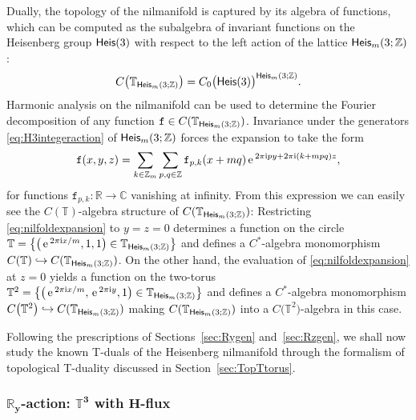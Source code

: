 \documentclass[10pt,a4paper]{amsart}
\numberwithin{equation}{section}
\newcommand{\Z}{\zed}
\def\ii{{{\rm i}}}
\newcommand{\Heis}{{\sf Heis}}
\newcommand{\complex}{{\mathbb C}} %
\newcommand{\zed}{{\mathbb Z}} %
\newcommand{\real}{{\mathbb R}} %
\newcommand{\torus}{{\mathbb T}} %
\def\e{{\,\rm e}\,}
\begin{document}
Dually, the topology of the nilmanifold is captured by its algebra of
functions, which can be computed as the subalgebra of invariant
functions on the
Heisenberg group $\Heis(3)$ with respect to the left action of the
lattice $\Heis_m(3;\Z)$:
\[
C\big(\torus_{\Heis_m(3;\Z)}\big) =
C_0\big(\Heis(3)\big)^{\Heis_m(3;\Z)} .
\]
Harmonic analysis on the nilmanifold can be used to determine the
Fourier decomposition of any function $\mathtt{f}\in
C(\torus_{\Heis_m(3;\Z)})$. Invariance under the generators
\eqref{eq:H3integeraction} of $\Heis_m(3;\Z)$ forces the expansion to take the form
\begin{gather}\label{eq:nilfoldexpansion}
\mathtt{f}(x,y,z) = \sum_{k\in\Z_m} \sum_{p,q\in\Z} \mathtt{f}_{p,k}(x+m q)
\e^{2\pi\ii p y +2\pi\ii (k+m p q) z} ,
\end{gather}
for functions $\mathtt{f}_{p,k}\colon \real\to\complex$ vanishing at
infinity. From this expression we can easily see the
$C(\torus)$-algebra structure of $C(\torus_{\Heis_m(3;\Z)})$: Restricting \eqref{eq:nilfoldexpansion} to $y=z=0$
determines a function on the circle $\torus=\big\{\big(\e^{2\pi\ii x/m},1,1\big)\in\torus_{\Heis_m(3;\Z)}\big\}$ and defines a $C^*$-algebra monomorphism
$C(\torus)\hookrightarrow C(\torus_{\Heis_m(3;\Z)})$. On the other hand, the evaluation
of \eqref{eq:nilfoldexpansion} at $z=0$ yields a function on the
two-torus $\torus^2=\big\{\big(\e^{2\pi\ii x/m},\e^{2\pi\ii
 y},1\big)\in\torus_{\Heis_m(3;\Z)}\big\}$ and defines a
$C^*$-algebra monomorphism $C\big(\torus^2\big)\hookrightarrow
C(\torus_{\Heis_m(3;\Z)})$ making $C(\torus_{\Heis_m(3;\Z)})$ into a
 $C\big(\torus^2\big)$-algebra in this case.

Following the prescriptions of Sections~\ref{sec:Rygen} and~\ref{sec:Rzgen}, we shall now study the
known T-duals of the Heisenberg nilmanifold
through the formalism of topological T-duality discussed
in Section~\ref{sec:TopTtorus}.

\subsubsection*{$\boldsymbol{\real_y}$-action: $\boldsymbol{\torus^3}$ with $\boldsymbol{H}$-flux}
\end{document}
